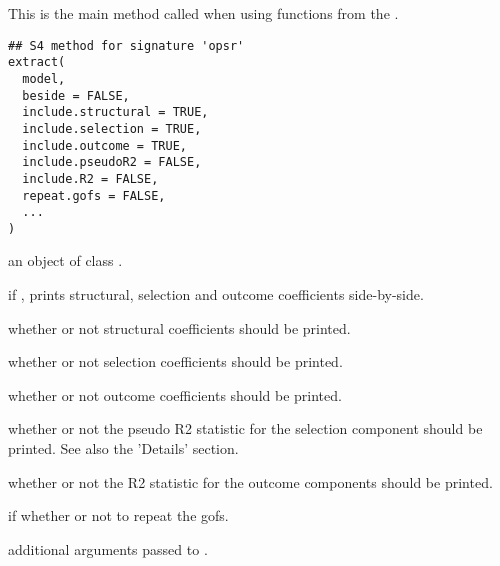 %
\begin{Description}
This is the main method called when using functions from the .
\end{Description}
%
\begin{Usage}
\begin{verbatim}
## S4 method for signature 'opsr'
extract(
  model,
  beside = FALSE,
  include.structural = TRUE,
  include.selection = TRUE,
  include.outcome = TRUE,
  include.pseudoR2 = FALSE,
  include.R2 = FALSE,
  repeat.gofs = FALSE,
  ...
)
\end{verbatim}
\end{Usage}
%
\begin{Arguments}
\begin{ldescription}
\item[\code{model}] an object of class .

\item[\code{beside}] if , prints structural, selection and outcome coefficients side-by-side.

\item[\code{include.structural}] whether or not structural coefficients should be printed.

\item[\code{include.selection}] whether or not selection coefficients should be printed.

\item[\code{include.outcome}] whether or not outcome coefficients should be printed.

\item[\code{include.pseudoR2}] whether or not the pseudo R2 statistic for the selection
component should be printed. See also the 'Details' section.

\item[\code{include.R2}] whether or not the R2 statistic for the outcome components
should be printed.

\item[\code{repeat.gofs}] if  whether or not to repeat the gofs.

\item[\code{...}] additional arguments passed to .
\end{ldescription}
\end{Arguments}
